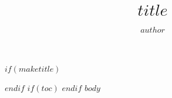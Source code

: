 \documentclass{article}
\title{$title$}
\author{$author$}
\begin{document}
$if(maketitle)$
  \maketitle
$endif$
$if(toc)$
  \tableofcontents
$endif$
$body$
\end{document}

